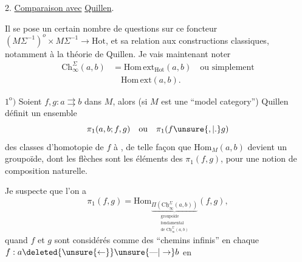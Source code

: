 2. \uline{Comparaison avec} \uline{Quillen}.

 Il se pose un certain nombre de questions sur ce foncteur $(M\Sigma^{-1})^o\times M\Sigma^{-1}\longrightarrow\mathrm{Hot}$, et sa relation aux constructions classiques, notamment à la théorie de Quillen. Je vais maintenant noter
\[
\begin{aligned}
\mathrm{Ch}_{\infty}^{\Sigma}(a,b)&=\mathrm{Hom}\,\mathrm{ext}_{\mathrm{Hot}}(a,b)\quad\text{ou simplement}\\
&\quad\mathrm{Hom}\,\mathrm{ext}(a,b).
\end{aligned}
\]

$1^{\mathrm o})$ Soient $f,g:a\rightrightarrows b$ dans $M$, alors (si $M$ est une ``model category'') Quillen définit un ensemble
\[
\pi_1(a,b;f,g)\quad\text{ou}\quad\pi_1(f\unsure{,|.}g)
\]
des classes d'homotopie de $f$ à , de telle façon que $\mathrm{Hom}_{M}(a,b)$ devient  un groupoïde, dont les flèches sont les éléments des $\pi_1(f,g)$, pour une notion de composition naturelle.

Je suspecte que l'on a
\[
\pi_1(f,g)=\mathrm{Hom}_{\underbrace{\Pi(\mathrm{C}\underline{\mathrm{h}}_{\infty}^{\Sigma}(a,b))}_{\substack{\text{groupoïde}\\\text{fondamental}\\\text{de }\mathrm{C}\underline{\mathrm{h}}_{\infty}^{\Sigma}(a,b)}}}(f,g),
\]
quand $f$ et $g$ sont considérés comme des ``chemins infinis'' en  chaque $f:a\deleted{\unsure{\leftarrow}}\unsure{\text{---}|\to}b$ en

